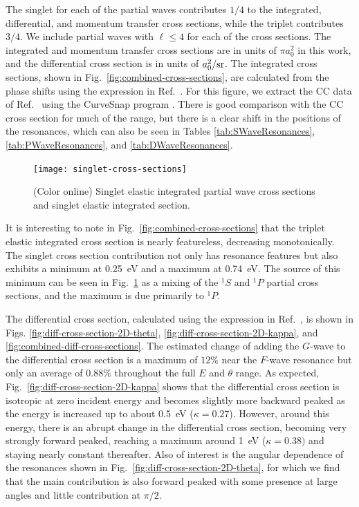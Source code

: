 \documentclass[preprint,showpacs,showkeys,preprintnumbers,amsmath,amssymb,longbibliography,pra,aps]{revtex4-1}
\begin{document}
The singlet for each of the partial waves contributes $1/4$ to the integrated,
differential, and momentum transfer cross sections, while the triplet
contributes $3/4$. We include partial waves with $\ell \leq 4$ for each of the
cross sections. The integrated and momentum transfer cross sections are
in units of $\pi a_0^2$ in this work, and the differential cross
section is in units of $a_0^2 / \rm{sr}$.
The integrated cross sections, shown in Fig.~\ref{fig:combined-cross-sections},
are calculated from the phase shifts using the expression in
Ref.~\cite{Bransden2003}. For this figure, we extract the CC data of
Ref.~\cite{Walters2004} using the CurveSnap program \cite{CurveSnap}.
There is good comparison with the 
CC cross section \cite{Walters2004} for much of the range, but there is a 
clear shift in the positions of the resonances, which can also be seen in 
Tables \ref{tab:SWaveResonances}, \ref{tab:PWaveResonances}, and
\ref{tab:DWaveResonances}.

\begin{figure}[H]
	\centering
	\texttt{[image: singlet-cross-sections]}
	\caption{(Color online) Singlet elastic integrated partial wave cross
sections and singlet elastic integrated section.}
	\label{fig:singlet-cross-sections}
\end{figure}

It is interesting to note in Fig.~\ref{fig:combined-cross-sections} that the
triplet elastic integrated cross section is nearly featureless, decreasing
monotonically. The singlet cross section contribution not only has resonance
features but also exhibits a minimum at 0.25~eV and a maximum at 0.74~eV.
The source of this minimum can be seen in
Fig.~\ref{fig:singlet-cross-sections} as a mixing of the $^1S$ and $^1P$
partial cross sections, and the maximum is due primarily to $^1P$.

The differential cross section, calculated using the expression in
Ref.~\cite{Bransden2003}, is shown in Figs.
\ref{fig:diff-cross-section-2D-theta}, \ref{fig:diff-cross-section-2D-kappa},
and \ref{fig:combined-diff-cross-sections}. The estimated change of adding
the $G$-wave to the differential cross section is a maximum of $12\%$ near
the $F$-wave resonance but only an average of $0.88\%$ throughout the full
$E$ and $\theta$ range. As expected, 
Fig.~\ref{fig:diff-cross-section-2D-kappa} shows that the 
differential cross section is 
isotropic at zero incident energy and becomes slightly more backward peaked 
as the energy is increased up to about \mbox{0.5 eV} ($\kappa = 0.27$). 
However, around this energy, there is an abrupt change in the differential 
cross section, becoming very strongly forward peaked, reaching a maximum 
around 1~eV ($\kappa = 0.38)$ and staying nearly constant thereafter. 
Also of interest is the angular dependence of the resonances shown in
Fig.~\ref{fig:diff-cross-section-2D-theta}, for which we find that the main 
contribution is also forward peaked with some presence at large angles and 
little contribution at $\pi/2$.
\end{document}
